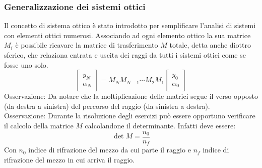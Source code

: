 \documentclass{article}
\theoremstyle{remark}
\begin{document}
\subsubsection*{Generalizzazione dei sistemi ottici}
Il concetto di sistema ottico è stato introdotto per semplificare l'analisi di sistemi con elementi ottici numerosi. Associando ad ogni elemento ottico la sua matrice $M_i$ è possibile ricavare la matrice di trasferimento $M$ totale, detta anche diottro sferico, che relaziona entrata e uscita dei raggi da tutti i sistemi ottici come se fosse uno solo.
\[
\begin{bmatrix}
y_N\\
\alpha_N
\end{bmatrix}
=
M_N M_{N-1} \cdots M_2 M_1
\begin{bmatrix}
y_0\\
\alpha_0
\end{bmatrix}
\]
Osservazione:
Da notare che la moltiplicazione delle matrici segue il verso opposto (da destra a sinistra) del percorso del raggio (da sinistra a destra).\\
Osservazione:
Durante la risoluzione degli esercizi può essere opportuno verificare il calcolo della matrice $M$ calcolandone il determinante. Infatti deve essere:
\begin{equation*}
\det M = \frac{n_0}{n_f}
\end{equation*}
Con $n_0$ indice di rifrazione del mezzo da cui parte il raggio e $n_f$ indice di rifrazione del mezzo in cui arriva il raggio.
\end{document}

